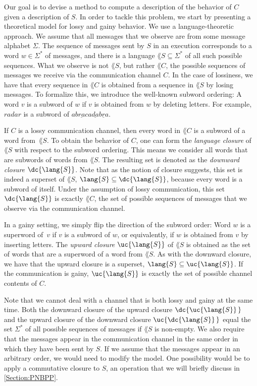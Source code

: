 \documentclass[../../diss.tex]{subfiles}
\begin{document}
Our goal is to devise a method to compute a description of the behavior of $C$ given a description of $S$.
In order to tackle this problem, we start by presenting a theoretical model for lossy and gainy behavior.
We use a language-theoretic approach.
We assume that all messages that we observe are from some message alphabet $\Sigma$.
The sequence of messages sent by $S$ in an execution corresponds to a word $w \in \Sigma^*$ of messages, and there is a language $\lang{S} \subseteq \Sigma^*$ of all such possible sequences.
What we observe is not $\lang{S}$, but rather $\lang{C}$, the possible sequences of messages we receive via the communication channel $C$.
In the case of lossiness, we have that every sequence in $\lang{C}$ is obtained from a sequence in $\lang{S}$ by losing messages.
To formalize this, we introduce the well-known subword ordering:
A word $v$ is a subword of $w$ if $v$ is obtained from $w$ by deleting letters.
For example, $\mathit{radar}$ is a subword of $\mathit{ab\underline{ra}ca\underline{da}b\underline{r}a}$.

If $C$ is a lossy communication channel, then every word in $\lang{C}$ is a subword of a word from~$\lang{S}$.
To obtain the behavior of $C$, one can form the \emph{language closure} of $\lang{S}$ with respect to the subword ordering.
This means we consider all words that are subwords of words from $\lang{S}$.
The resulting set is denoted as the \emph{downward closure} $\dc{\lang{S}}$.
Note that as the notion of closure suggests, this set is indeed a superset of $\lang{S}$, $\lang{S} \subseteq \dc{\lang{S}}$, because every word is a subword of itself.
Under the assumption of lossy communication, this set $\dc{\lang{S}}$ is exactly $\lang{C}$, the set of possible sequences of messages that we observe via the communication channel.

In a gainy setting, we simply flip the direction of the subword order:
Word $w$ is a superword of~$v$ if $v$ is a subword of $w$, or equivalently, if $w$ is obtained from $v$ by inserting letters.
The \emph{upward closure} $\uc{\lang{S}}$ of $\lang{S}$ is obtained as the set of words that are a superword of a word from $\lang{S}$.
As with the downward closure, we have that the upward closure is a superset, $\lang{S} \subseteq \uc{\lang{S}}$.
If the communication is gainy, $\uc{\lang{S}}$ is exactly the set of possible channel contents of $C$.

Note that we cannot deal with a channel that is both lossy and gainy at the same time.
Both the downward closure of the upward closure $\dc{\uc{\lang{S}}\,}$ and the upward closure of the downward closure $\uc{\dc{\lang{S}}\,}$ equal the set $\Sigma^*$ of all possible sequences of messages if $\lang{S}$ is non-empty.
We also require that the messages appear in the communication channel in the same order in which they have been sent by $S$.
If we assume that the messages appear in an arbitrary order, we would need to modify the model.
One possibility would be to apply a commutative closure to $S$, an operation that we will briefly discuss in \cref{Section:PNBPP}.
\end{document}
